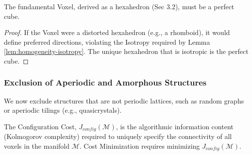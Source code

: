 \begin{corollary}
The fundamental Voxel, derived as a hexahedron (Sec 3.2), must be a perfect cube.
\end{corollary}
\begin{proof}
If the Voxel were a distorted hexahedron (e.g., a rhomboid), it would define preferred directions, violating the Isotropy required by Lemma \ref{lem:homogeneity-isotropy}. The unique hexahedron that is isotropic is the perfect cube.
\end{proof}

\subsubsection{Exclusion of Aperiodic and Amorphous Structures}

We now exclude structures that are not periodic lattices, such as random graphs or aperiodic tilings (e.g., quasicrystals).

\begin{definition}
The Configuration Cost, $J_{config}(\mathcal{M})$, is the algorithmic information content (Kolmogorov complexity) required to uniquely specify the connectivity of all voxels in the manifold $\mathcal{M}$. Cost Minimization requires minimizing $J_{config}(\mathcal{M})$.
\end{definition}

